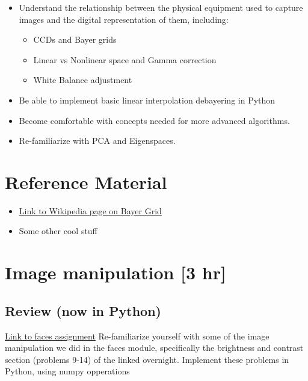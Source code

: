 \documentclass{tufte-handout}
\begin{document}
\begin{itemize}
\item Understand the relationship between the physical equipment used to capture
images and the digital representation of them, including:
    \begin{itemize}
        \item CCDs and Bayer grids
        \item Linear vs Nonlinear space and Gamma correction
        \item White Balance adjustment
    \end{itemize}
\item Be able to implement basic linear interpolation debayering in Python
\item Become comfortable with concepts needed for more advanced algorithms.
\item Re-familiarize with PCA and Eigenspaces.
\end{itemize}


\section{Reference Material}

\begin{itemize}
\item \href{https://en.wikipedia.org/wiki/Bayer_filter
}{Link to Wikipedia page on Bayer Grid}
\item Some other cool stuff
\end{itemize}

\section{Image manipulation [3 hr]}

\subsection{Review (now in Python)}
\href{https://drive.google.com/file/d/0B7LNBbaxYFujOHpEU2FDdkF6VEE/view
}{Link to faces assignment}
Re-familiarize yourself with some of the image manipulation we did in the faces module, specifically the brightness and contrast section (problems 9-14) of the linked overnight. Implement these problems in Python, using numpy opperations
\end{document}
